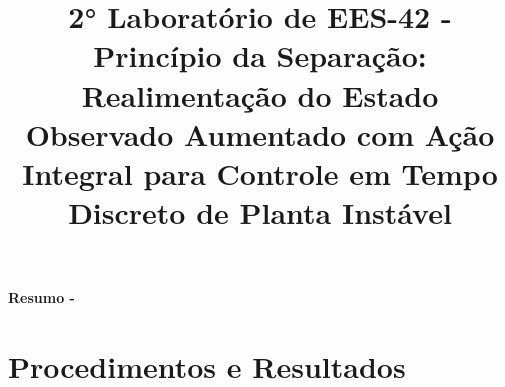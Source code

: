 \documentclass[9pt,conference]{IEEEtran}
\begin{document}
    
    \title{2° Laboratório de EES-42 - Princípio da Separação: Realimentação do Estado Observado Aumentado com 
Ação Integral para Controle em Tempo Discreto de Planta Instável}

    \author{
        
    }
    
    \maketitle
    
    
\textbf{Resumo - %
}




\section{Procedimentos e Resultados}

\end{document}
